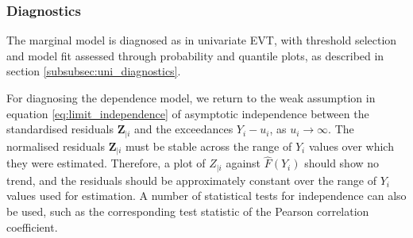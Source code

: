 \documentclass{article}
\numberwithin{equation}{section}
\begin{document}

\subsubsection{Diagnostics} \label{subsubsec:ce_diagnostics}

The marginal model is diagnosed as in univariate EVT, with threshold selection and model fit assessed through probability and quantile plots, as described in section \ref{subsubsec:uni_diagnostics}.

For diagnosing the dependence model, we return to the weak assumption in equation \ref{eq:limit_independence} of asymptotic independence between the standardised residuals $\bm{Z}_{\mid i}$ and the exceedances $Y_i - u_i$, as $u_i \to \infty$.
The normalised residuals $\bm{Z}_{\mid i}$ must be stable across the range of $Y_i$ values over which they were estimated. 
Therefore, a plot of $Z_{\mid i}$ against $\hat{F}(Y_i)$ should show no trend, and the residuals should be approximately constant over the range of $Y_i$ values used for estimation.
A number of statistical tests for independence can also be used, such as the corresponding test statistic of the Pearson correlation coefficient. 
\end{document}
